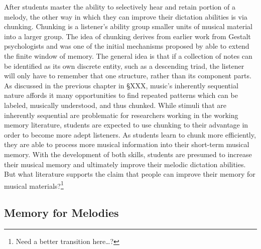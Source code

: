 \documentclass[]{book}
\let\rmarkdownfootnote\footnote%
\def\footnote{\protect\rmarkdownfootnote}
\begin{document}
After students master the ability to selectively hear and retain portion of a melody, the other way in which they can improve their dictation abilities is via chunking.
Chunking is a listener's ability group smaller units of musical material into a larger group.
The idea of chunking derives from earlier work from Gestalt psychologists and was one of the initial mechanisms proposed by \citet{millerMagicalNumberSeven1956} able to extend the finite window of memory.
The general idea is that if a collection of notes can be identified as its own discrete entity, such as a descending triad, the listener will only have to remember that one structure, rather than its component parts.
As discussed in the previous chapter in §XXX, music's inherently sequential nature affords it many opportunities to find repeated patterns which can be labeled, musically understood, and thus chunked.
While stimuli that are inherently sequential are problematic for researchers working in the working memory literature, students are expected to use chunking to their advantage in order to become more adept listeners.
As students learn to chunk more efficiently, they are able to process more musical information into their short-term musical memory.
With the development of both skills, students are presumed to increase their musical memory and ultimately improve their melodic dictation abilities.
But what literature supports the claim that people can improve their memory for musical materials?\footnote{Need a better transition here\ldots{}?}

\hypertarget{memory-for-melodies}{%
\subsection{Memory for Melodies}\label{memory-for-melodies}}
\end{document}
